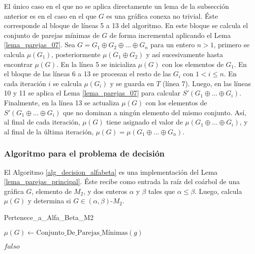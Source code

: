 El único caso en el que no se aplica directamente un lema de la subsección anterior es en el caso en el que $G$ es una gráfica conexa no trivial. Éste corresponde al bloque de líneas 5 a 13 del algoritmo. En este bloque se calcula el conjunto de parejas mínimas de $G$ de forma incremental aplicando el Lema \ref{lema_parejas_07}. Sea $G=G_1\oplus G_2 \oplus \dots \oplus G_n$ para un entero $n>1$, primero se calcula $\mu(G_1)$, posteriormente $\mu(G_1\oplus G_2)$ y así sucesivamente hasta encontrar $\mu(G)$. En la línea 5 se inicializa $\mu(G)$ con los elementos de $G_1$. En el bloque de las líneas 6 a 13 se procesan el resto de las $G_i$ con $1<i\le n$. En cada iteración $i$ se calcula $\mu(G_i)$ y se guarda en $T$ (línea 7). Luego, en las líneas 10 y 11 se aplica el Lema \ref{lema_parejas_07} para calcular $S'(G_1 \oplus \dots \oplus G_i)$. Finalmente, en la línea 13 se actualiza $\mu(G)$ con los elementos de $S'(G_1 \oplus \dots \oplus G_i)$ que no dominan a ningún elemento del mismo conjunto. Así, al final de cada iteración, $\mu(G)$ tiene asignado el valor de $\mu(G_1 \oplus \dots \oplus G_i)$, y al final de la última iteración, $\mu(G)=\mu(G_1 \oplus \dots \oplus G_n)$.


\subsubsection{Algoritmo para el problema de decisión}

El Algoritmo \ref{alg_decision_alfabeta} es una implementación del Lema \ref{lema_parejas_principal}. Éste recibe como entrada la raíz del coárbol de una gráfica $G$, elemento de $M_2$, y dos enteros $\alpha$ y $\beta$ tales que $\alpha \le \beta$. Luego, calcula $\mu(G)$ y determina si $G\in(\alpha,\beta)$-$M_2$.

\begin{algorithm}[ht!]
\caption{Pertenece\_a\_Alfa\_Beta\_M2}
\label{alg_decision_alfabeta}
\DontPrintSemicolon %

$\mu(G) \gets \text{Conjunto\_De\_Parejas\_Mínimas}(g)$\;


\Return $falso$\;

\end{algorithm}

